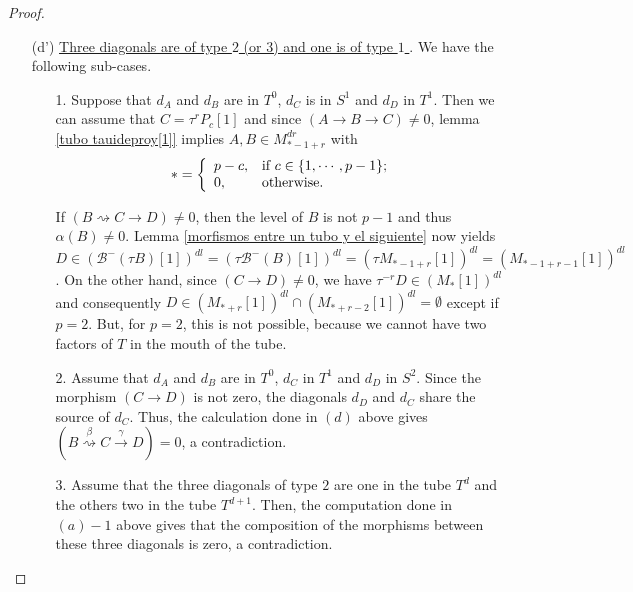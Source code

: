 \documentclass{amsart}
\theoremstyle{plain}
\theoremstyle{definition}
\begin{document}
\begin{proof}
\begin{itemize}
\begin{itemize}
       \end{itemize}

  \item [(d')] \underline{Three diagonals are of type $2$ (or 3) and one is of type $1$ }. We have the following sub-cases.

      \begin{itemize}
        \item [1.] Suppose that  $d_A$ and $d_B$ are in  $T^0$, $d_C$ is in $S^1$ and $d_D$ in $T^1$. Then we can assume that $C= \tau^r P_c[1]$ and since
$(A \rightarrow B \rightarrow C)\neq 0$,  lemma \ref{tubo tauideproy[1]} implies
$A,B\in M_{*-1+r}^{dr}$  with $$*=\left\{
                     \begin{array}{ll}
                       p-c, & \hbox{if $c\in\{1,\cdots, p-1\}$;} \\
                       0, & \hbox{otherwise.}
                     \end{array}
                   \right.
$$

 If $(B\rightsquigarrow C \rightarrow D)\neq 0$, then  the level of  $B$ is not $p-1$ and thus   $\alpha(B)\neq 0$. Lemma \ref{morfismos entre un tubo y el siguiente}  now yields  $D\in (\mathcal{B}^-(\tau
B)[1])^{dl}=(\tau \mathcal{B}^-(B)[1])^{dl}=(\tau M_{*-1+r}[1])^{dl}=(M_{*-1+r-1}[1])^{dl}$.
On the other hand, since $(C\rightarrow D)\neq 0$, we have  $\tau^{-r}D\in (M_{*}[1])^{dl}$ and consequently
$D\in (M_{*+r}[1])^{dl}\cap (M_{*+r-2}[1])^{dl} =\emptyset $ except if  $p=2$. But, for  $p=2$,  this  is not  possible, because we cannot have two factors of  $T$ in the mouth of the tube.\\

        \item  [2.] Assume that $d_A$ and $d_B$ are in $T^0$, $d_C$ in $T^1$ and  $d_D$ in $S^2$. Since the morphism $(C\rightarrow D)$ is not zero, the diagonals $d_D$ and $d_C$ share the source of $d_C$. Thus, the calculation done in  $(d)$ above gives $(B \stackrel{\beta} {\rightsquigarrow} C\stackrel {\gamma}{\rightarrow} D)=0$, a contradiction.\\

        \item [3.] Assume that the three diagonals of type $2$ are one in the tube $T^d$ and the others two in the tube $T^{d+1}$. Then, the computation done   in $(a)-1$ above gives that the composition of the morphisms between these three diagonals is zero, a contradiction.\\


\end{itemize}
\end{itemize}
\end{proof}
\end{document}
